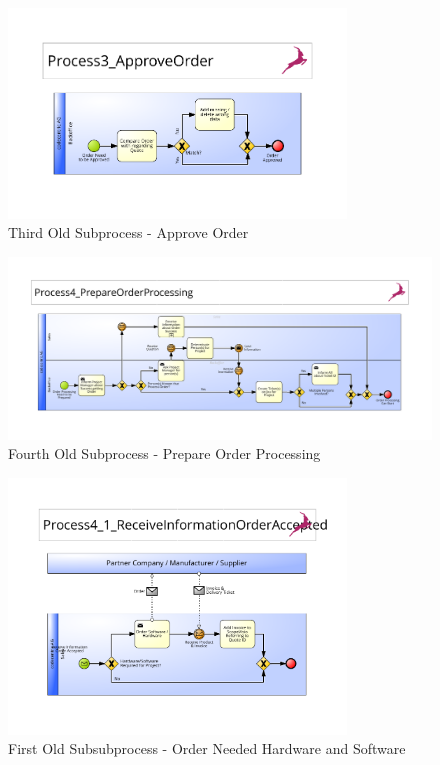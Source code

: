 \begin{figure}[h]
	\begin{center}
		\includegraphics[width=0.8\textwidth]{./appendix/pbmnOld/0-3_approveOrder.pdf}
		\caption{Third Old Subprocess - Approve Order}\label{fig:0-3_sub}
	\end{center}
\end{figure}

\begin{figure}[h]
	\begin{center}
		\includegraphics[width=0.9\textheight,angle=90]{./appendix/pbmnOld/0-4_orderProcessing.pdf}
		\caption{Fourth Old Subprocess - Prepare Order Processing}\label{fig:0-4_sub}
	\end{center}
\end{figure}

\begin{figure}[h]
	\begin{center}
		\includegraphics[width=0.8\textwidth]{./appendix/pbmnOld/0-4-1_orderSoftware.pdf}
		\caption{First Old Subsubprocess - Order Needed Hardware and Software}\label{fig:0-4-1_subsub}
	\end{center}
\end{figure}